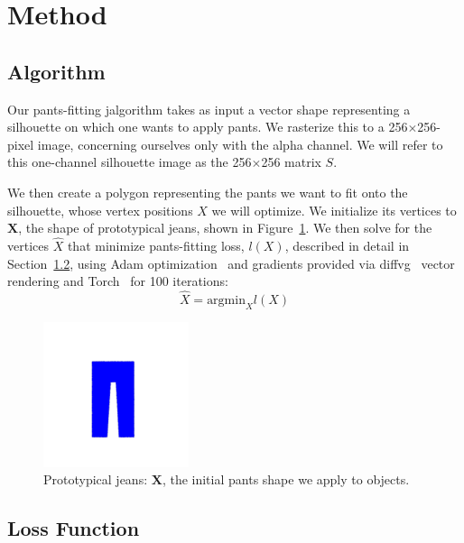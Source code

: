 \documentclass[twocolumn]{article}
\begin{document}
\section{Method}
\label{sec:method}

\subsection{Algorithm}

Our pants-fitting jalgorithm takes as input a vector shape representing a silhouette on which one wants to apply pants. We rasterize this to a 256$\times$256-pixel image, concerning ourselves only with the alpha channel. We will refer to this one-channel silhouette image as the 256$\times$256 matrix $S$.

We then create a polygon representing the pants we want to fit onto the silhouette, whose vertex positions $X$ we will optimize. We initialize its vertices to $\mathbf{X}$, the shape of prototypical jeans, shown in Figure~\ref{fig:prototypical}. We then solve for the vertices $\hat{X}$ that minimize pants-fitting loss, $l(X)$, described in detail in Section~\ref{sec:loss}, using Adam optimization~\cite{Adam} and gradients provided via diffvg~\cite{Li:2020:DVG} vector rendering and Torch~\cite{paszke2017automatic} for 100 iterations:
\begin{equation}
    \hat{X} = \text{argmin}_X l(X)
\end{equation}

\begin{figure}
    \centering
    \includegraphics[width=0.38\textwidth]{img/init.png}
    \caption{Prototypical jeans: $\mathbf{X}$, the initial pants shape we apply to objects.}
    \label{fig:prototypical}
\end{figure}

\subsection{Loss Function}
\label{sec:loss}
\end{document}
